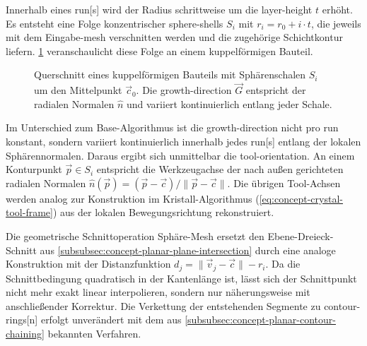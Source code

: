                 Innerhalb eines \gls{run}[s] wird der Radius schrittweise um die \gls{layer-height} $t$ erhöht.
                Es entsteht eine Folge konzentrischer \glspl{sphere-shell} $S_i$ mit $r_i = r_0 + i \cdot t$, die jeweils mit dem Eingabe-\gls{mesh} verschnitten werden und die zugehörige Schichtkontur liefern.
                \cref{fig:concept-sphere-shells} veranschaulicht diese Folge an einem kuppelförmigen Bauteil.

                \begin{figure}[ht]
                    \centering
                    
                    \caption[Konzentrische Sphärenschalen am Bauteil.]{
                        Querschnitt eines kuppelförmigen Bauteils mit Sphärenschalen $S_i$ um den Mittelpunkt $\vec{c}_0$.
                        Die \gls{growth-direction} $\vec{G}$ entspricht der radialen Normalen $\hat{n}$ und variiert kontinuierlich entlang jeder Schale.
                    }
                    \label{fig:concept-sphere-shells}
                \end{figure}

                Im Unterschied zum Base-Algorithmus ist die \gls{growth-direction} nicht pro \gls{run} konstant, sondern variiert kontinuierlich innerhalb jedes \gls{run}[s] entlang der lokalen Sphärennormalen.
                Daraus ergibt sich unmittelbar die \gls{tool-orientation}.
                An einem Konturpunkt $\vec{p} \in S_i$ entspricht die Werkzeugachse der nach außen gerichteten radialen Normalen $\hat{n}(\vec{p}) = (\vec{p} - \vec{c}) / \lVert\vec{p} - \vec{c}\rVert$.
                Die übrigen Tool-Achsen werden analog zur Konstruktion im Kristall-Algorithmus (\cref{eq:concept-crystal-tool-frame}) aus der lokalen Bewegungsrichtung rekonstruiert.

                Die geometrische Schnittoperation Sphäre-Mesh ersetzt den Ebene-Dreieck-Schnitt aus \cref{subsubsec:concept-planar-plane-intersection} durch eine analoge Konstruktion mit der Distanzfunktion $d_j = \lVert\vec{v}_j - \vec{c}\rVert - r_i$.
                Da die Schnittbedingung quadratisch in der Kantenlänge ist, lässt sich der Schnittpunkt nicht mehr exakt linear interpolieren, sondern nur näherungsweise mit anschließender Korrektur.
                Die Verkettung der entstehenden Segmente zu \glspl{contour-ring}[n] erfolgt unverändert mit dem aus \cref{subsubsec:concept-planar-contour-chaining} bekannten Verfahren.

